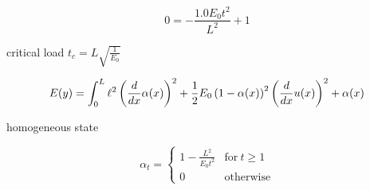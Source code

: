 \documentclass[]{article}
\begin{document}
\begin{equation}
  \label{eqn:mod-criterion}
  0=- \frac{1.0 E_{0} t^{2}}{L^{2}} + 1
\end{equation}

critical load $t_c = L \sqrt{\frac{1}{E_{0}}}$

\begin{equation}
  \label{eqn:mod-energy}
E(y)  =  \int_0^L
\ell^{2} \left(\frac{d}{d x} \alpha{\left(x \right)}\right)^{2} + \frac{1}{2} E_0\left(1 - \alpha{\left(x \right)}\right)^{2} \left(\frac{d}{d x} u{\left(x \right)}\right)^{2} + \alpha{\left(x \right)}
\end{equation}


homogeneous state

\begin{equation}
  \label{eqn:mod-homogeneous}
  \alpha_t =
  \begin{cases}
    1 - \frac{L^{2}}{E_{0} t^{2}} & \text{for}\: t \geq 1 \\
    0 & \text{otherwise} \end{cases}
\end{equation}
\end{document}
